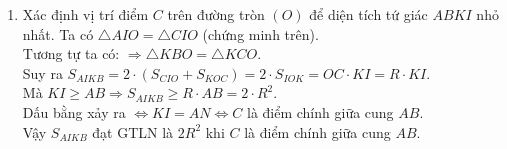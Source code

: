 \begin{bt}
{\begin{enumerate}
\begin{eqnarray*}
				& \Leftrightarrow & \widehat{IOK} = \dfrac{180^\circ}{2}\\
				& \Leftrightarrow & \widehat{IOK} = 90^\circ\\
				& \Leftrightarrow & \triangle IOK \text{ vuông tại } O.
			\end{eqnarray*}
			Áp dụng hệ thức lượng cho tam giác vuông $\triangle IOK$ vuông tại $O$, đường cao $OC$ ta có:
			\begin{eqnarray*}
				& & {OC}^2=IC\cdot KC\\
				& \Leftrightarrow & {OC}^2=IA \cdot BK\\
				& \Leftrightarrow & R^2 = IA \cdot BK\\
				& \Rightarrow & \text{điều phải chứng minh.}
			\end{eqnarray*}
			\item Xác định vị trí điểm $C$ trên đường tròn $(O)$ để diện tích tứ giác $ABKI$ nhỏ nhất.
			Ta có $ \triangle AIO = \triangle CIO $ (chứng minh trên).\\
			Tương tự ta có: $\Rightarrow \triangle KBO = \triangle KCO $.\\
			Suy ra $S_{AIKB}=2\cdot (S_{CIO}+S_{KOC})=2\cdot S_{IOK} = OC\cdot KI = R \cdot KI$.\\
			Mà $KI\ge AB \Rightarrow S_{AIKB} \ge R \cdot AB = 2 \cdot R^2$.\\
			Dấu bằng xảy ra $\Leftrightarrow KI=AN \Leftrightarrow C$ là điểm chính giữa cung $AB$.\\
			Vậy $S_{AIKB}$ đạt GTLN là $2R^2$ khi $C$ là điểm chính giữa cung $AB$.
		\end{enumerate}
	}
\end{bt}


